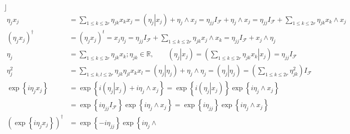 \documentclass[aps,preprint]{revtex4}%
\begin{document}
$\rfloor$%
\begin{align}
\eta_{j}x_{j}  &  =%
{\textstyle\sum\limits_{1\leq k\leq2r}}
\eta_{jk}x_{k}x_{j}=\left(  \left.  \eta_{j}\right\vert x_{j}\right)
+\eta_{j}\wedge x_{j}=\mathit{\eta}_{jj}I_{\mathcal{F}}+\eta_{j}\wedge
x_{j}=\mathit{\eta}_{jj}I_{\mathcal{F}}+%
{\textstyle\sum\limits_{1\leq k\leq2r}}
\mathit{\eta}_{jk}x_{k}\wedge x_{j}\\
\left(  \eta_{j}x_{j}\right)  ^{\dagger}  &  =\left(  \eta_{j}x_{j}\right)
^{t}=x_{j}\eta_{j}=\mathit{\eta}_{jj}I_{\mathcal{F}}+%
{\textstyle\sum\limits_{1\leq k\leq2r}}
\mathit{\eta}_{jk}x_{j}\wedge x_{k}=\mathit{\eta}_{jj}I_{\mathcal{F}}%
+x_{j}\wedge\eta_{j}\\
\eta_{j}  &  =%
{\textstyle\sum\limits_{1\leq k\leq2r}}
\mathit{\eta}_{jk}x_{k};\mathit{\eta}_{jk}\in\mathbb{R},\qquad\left(  \left.
\eta_{j}\right\vert x_{j}\right)  =\left(  \left.
{\textstyle\sum\limits_{1\leq k\leq2r}}
\mathit{\eta}_{jk}x_{k}\right\vert x_{j}\right)  =\mathit{\eta}_{jj}%
I_{\mathcal{F}}\\
\eta_{j}^{2}  &  =%
{\textstyle\sum\limits_{1\leq k,l\leq2r}}
\mathit{\eta}_{jk}\mathit{\eta}_{jl}x_{k}x_{l}=\left(  \left.  \eta
_{j}\right\vert \eta_{j}\right)  +\eta_{j}\wedge\eta_{j}=\left(  \left.
\eta_{j}\right\vert \eta_{j}\right)  =\left(
{\textstyle\sum\limits_{1\leq k\leq2r}}
\mathit{\eta}_{jk}^{2}\right)  I_{\mathcal{F}}\\
\exp\left\{  i\eta_{j}x_{j}\right\}   &  =\exp\left\{  i\left(  \left.
\eta_{j}\right\vert x_{j}\right)  +i\eta_{j}\wedge x_{j}\right\}
=\exp\left\{  i\left(  \left.  \eta_{j}\right\vert x_{j}\right)  \right\}
\exp\left\{  i\eta_{j}\wedge x_{j}\right\} \\
&  =\exp\left\{  i\mathit{\eta}_{jj}I_{\mathcal{F}}\right\}  \exp\left\{
i\eta_{j}\wedge x_{j}\right\}  =\exp\left\{  i\mathit{\eta}_{jj}\right\}
\exp\left\{  i\eta_{j}\wedge x_{j}\right\} \\
\left(  \exp\left\{  i\eta_{j}x_{j}\right\}  \right)  ^{\dagger}  &
=\exp\left\{  -i\mathit{\eta}_{jj}\right\}  \exp\left\{  i\eta_{j}\wedge

\end{align}
\end{document}
